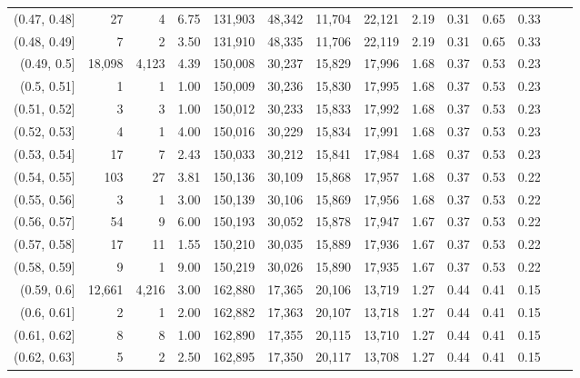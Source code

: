 \begin{tabular}{rrrrrrrrrrrrrr}
(0.47, 0.48]   &      27 &      4 &   6.75 &  131,903 &   48,342 &  11,704 &  22,121 &  2.19 &  0.31 &  0.65 &      0.33 \\
(0.48, 0.49]   &       7 &      2 &   3.50 &  131,910 &   48,335 &  11,706 &  22,119 &  2.19 &  0.31 &  0.65 &      0.33 \\
(0.49, 0.5]    &  18,098 &  4,123 &   4.39 &  150,008 &   30,237 &  15,829 &  17,996 &  1.68 &  0.37 &  0.53 &      0.23 \\
(0.5, 0.51]    &       1 &      1 &   1.00 &  150,009 &   30,236 &  15,830 &  17,995 &  1.68 &  0.37 &  0.53 &      0.23 \\
(0.51, 0.52]   &       3 &      3 &   1.00 &  150,012 &   30,233 &  15,833 &  17,992 &  1.68 &  0.37 &  0.53 &      0.23 \\
(0.52, 0.53]   &       4 &      1 &   4.00 &  150,016 &   30,229 &  15,834 &  17,991 &  1.68 &  0.37 &  0.53 &      0.23 \\
(0.53, 0.54]   &      17 &      7 &   2.43 &  150,033 &   30,212 &  15,841 &  17,984 &  1.68 &  0.37 &  0.53 &      0.23 \\
(0.54, 0.55]   &     103 &     27 &   3.81 &  150,136 &   30,109 &  15,868 &  17,957 &  1.68 &  0.37 &  0.53 &      0.22 \\
(0.55, 0.56]   &       3 &      1 &   3.00 &  150,139 &   30,106 &  15,869 &  17,956 &  1.68 &  0.37 &  0.53 &      0.22 \\
(0.56, 0.57]   &      54 &      9 &   6.00 &  150,193 &   30,052 &  15,878 &  17,947 &  1.67 &  0.37 &  0.53 &      0.22 \\
(0.57, 0.58]   &      17 &     11 &   1.55 &  150,210 &   30,035 &  15,889 &  17,936 &  1.67 &  0.37 &  0.53 &      0.22 \\
(0.58, 0.59]   &       9 &      1 &   9.00 &  150,219 &   30,026 &  15,890 &  17,935 &  1.67 &  0.37 &  0.53 &      0.22 \\
(0.59, 0.6]    &  12,661 &  4,216 &   3.00 &  162,880 &   17,365 &  20,106 &  13,719 &  1.27 &  0.44 &  0.41 &      0.15 \\
(0.6, 0.61]    &       2 &      1 &   2.00 &  162,882 &   17,363 &  20,107 &  13,718 &  1.27 &  0.44 &  0.41 &      0.15 \\
(0.61, 0.62]   &       8 &      8 &   1.00 &  162,890 &   17,355 &  20,115 &  13,710 &  1.27 &  0.44 &  0.41 &      0.15 \\
(0.62, 0.63]   &       5 &      2 &   2.50 &  162,895 &   17,350 &  20,117 &  13,708 &  1.27 &  0.44 &  0.41 &      0.15 \\

\end{tabular}
